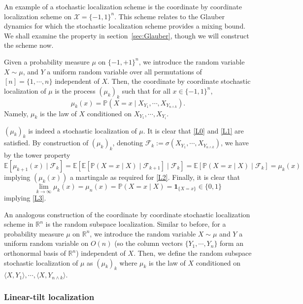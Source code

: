 An example of a stochastic localization scheme is the coordinate by coordinate localization scheme 
on \(\mathcal{X} = \{-1, 1\}^n\). This scheme relates to the Glauber dynamics for which the stochastic 
localization scheme provides a mixing bound. We shall examine the property in section~\ref{sec:Glauber}, 
though we will construct the scheme now. 

Given a probability measure \(\mu\) on \(\{-1, +1\}^n\), we introduce the random variable \(X \sim \mu\), and 
\(Y\) a uniform random variable over all permutations of \([n] = \{1, \cdots, n\}\) independent of \(X\). 
Then, the coordinate by coordinate stochastic localization of \(\mu\) is the process \((\mu_k)_{k}\)
such that for all \(x \in \{-1, 1\}^n\),
\[\mu_k(x) = \mathbb{P}(X = x \mid X_{Y_1}, \cdots, X_{Y_{n \wedge k}}).\]
Namely, \(\mu_k\) is the law of \(X\) conditioned on \(X_{Y_1}, \cdots, X_{Y_i}\).

\((\mu_k)_{k}\) is indeed a stochastic localization of \(\mu\). It is clear that \ref{L0} and \ref{L1} are 
satisfied. By construction of \((\mu_k)_k\), denoting 
\(\mathscr{F}_k := \sigma(X_{Y_1}, \cdots, X_{Y_{n \wedge k}})\), we have by the tower property
\[\mathbb{E}[\mu_{k + 1}(x) \mid \mathscr{F}_k] 
  = \mathbb{E}[\mathbb{E}[\mathbb{P}(X = x \mid X) \mid \mathscr{F}_{k + 1}] \mid \mathscr{F}_k]
  = \mathbb{E}[\mathbb{P}(X = x \mid X) \mid \mathscr{F}_k] = \mu_k(x)\]
implying \((\mu_k(x))\) a martingale as required for \ref{L2}. Finally, it is clear that
\[\lim_{k \to \infty} \mu_k(x) = \mu_n(x) = \mathbb{P}(X = x \mid X) = \mathbf{1}_{\{X = x\}} \in \{0, 1\}\]
implying \ref{L3}.

An analogous construction of the coordinate by coordinate stochastic localization scheme in \(\mathbb{R}^n\) 
is the random subspace localization. Similar to before, for a probability measure \(\mu\) on \(\mathbb{R}^n\),
we introduce the random variable \(X \sim \mu\) and \(Y\) a uniform random variable on \(O(n)\) 
(so the column vectors \(\{Y_1, \cdots, Y_n\}\) form an orthonormal basis of \(\mathbb{R}^n\)) 
independent of \(X\). Then, we define the random subspace stochastic localization of \(\mu\) as \((\mu_k)_k\) 
where \(\mu_k\) is the law of \(X\) conditioned on \(\langle X, Y_1\rangle, \cdots, \langle X, Y_{n \wedge k}\rangle\).

\subsubsection{Linear-tilt localization}\label{sec:construct}

